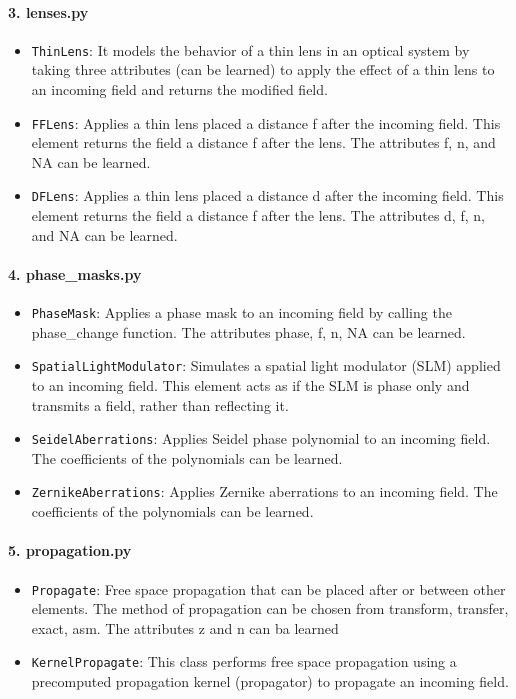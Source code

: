 \documentclass[a4paper,12pt]{report}
\begin{document}
\paragraph*{3. \textbf{lenses.py}}
\begin{itemize}
  \item \texttt{ThinLens}: It models the behavior of a thin lens in an optical system by taking three attributes (can be learned) to apply the effect of a thin lens to an incoming field and returns the modified field.
  \item \texttt{FFLens}:  Applies a thin lens placed a distance f after the incoming field. This element returns the field a distance f after the lens. The attributes f, n, and NA can be learned.
  \item \texttt{DFLens}: Applies a thin lens placed a distance d after the incoming field. This element returns the field a distance f after the lens. The attributes d, f, n, and NA can be learned.
\end{itemize}

\paragraph*{4. \textbf{phase\_masks.py}}
\begin{itemize}
  \item \texttt{PhaseMask}: Applies a phase mask to an incoming field by calling the phase\_change function. The attributes phase, f, n, NA can be learned.
  \item \texttt{SpatialLightModulator}: Simulates a spatial light modulator (SLM) applied to an incoming field. This element acts as if the SLM is phase only and transmits a field, rather than reflecting it.
  \item \texttt{SeidelAberrations}: Applies Seidel phase polynomial to an incoming field. The coefficients of the polynomials can be learned.
  \item \texttt{ZernikeAberrations}: Applies Zernike aberrations to an incoming field. The coefficients of the polynomials can be learned.
\end{itemize}

\paragraph*{5. \textbf{propagation.py}}
\begin{itemize}
  \item \texttt{Propagate}: Free space propagation that can be placed after or between other elements. The method of propagation can be chosen from transform, transfer, exact, asm. The attributes z and n can ba learned
  \item \texttt{KernelPropagate}: This class performs free space propagation using a precomputed propagation kernel (propagator) to propagate an incoming field.
\end{itemize}
\end{document}
